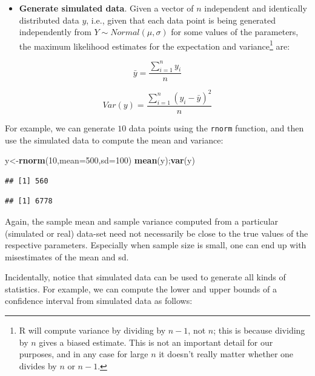 \documentclass[12pt,]{krantz}
\newenvironment{Shaded}{\begin{snugshade}}{\end{snugshade}}
\newcommand{\KeywordTok}[1]{\textcolor[rgb]{0.13,0.29,0.53}{\textbf{#1}}}
\newcommand{\DataTypeTok}[1]{\textcolor[rgb]{0.13,0.29,0.53}{#1}}
\newcommand{\DecValTok}[1]{\textcolor[rgb]{0.00,0.00,0.81}{#1}}
\newcommand{\NormalTok}[1]{#1}
\providecommand{\tightlist}{%
  \setlength{\itemsep}{0pt}\setlength{\parskip}{0pt}}
\theoremstyle{definition}
\theoremstyle{definition}
\theoremstyle{definition}
\theoremstyle{remark}
\begin{document}
\begin{itemize}
\tightlist
\item
  \textbf{Generate simulated data}. Given a vector of \(n\) independent
  and identically distributed data \(y\), i.e., given that each data
  point is being generated independently from
  \(Y \sim Normal(\mu,\sigma)\) for some values of the parameters, the
  maximum likelihood estimates for the expectation and
  variance\footnote{R will compute variance by dividing by \(n-1\), not
    \(n\); this is because dividing by \(n\) gives a biased estimate.
    This is not an important detail for our purposes, and in any case
    for large \(n\) it doesn't really matter whether one divides by
    \(n\) or \(n-1\).} are:
\end{itemize}

\begin{equation}
\bar{y} =  \frac{\sum_{i=1}^n y_i}{n} 
\end{equation}

\begin{equation}
Var(y) = \frac{\sum_{i=1}^n (y_i-
\bar{y})^2}{n}
\end{equation}

For example, we can generate \(10\) data points using the \texttt{rnorm}
function, and then use the simulated data to compute the mean and
variance:

\begin{Shaded}
\begin{Highlighting}[]
\NormalTok{y<-}\KeywordTok{rnorm}\NormalTok{(}\DecValTok{10}\NormalTok{,}\DataTypeTok{mean=}\DecValTok{500}\NormalTok{,}\DataTypeTok{sd=}\DecValTok{100}\NormalTok{)}
\KeywordTok{mean}\NormalTok{(y);}\KeywordTok{var}\NormalTok{(y)}
\end{Highlighting}
\end{Shaded}

\begin{verbatim}
## [1] 560
\end{verbatim}

\begin{verbatim}
## [1] 6778
\end{verbatim}

Again, the sample mean and sample variance computed from a particular
(simulated or real) data-set need not necessarily be close to the true
values of the respective parameters. Especially when sample size is
small, one can end up with misestimates of the mean and sd.

Incidentally, notice that simulated data can be used to generate all
kinds of statistics. For example, we can compute the lower and upper
bounds of a confidence interval from simulated data as follows:
\end{document}
